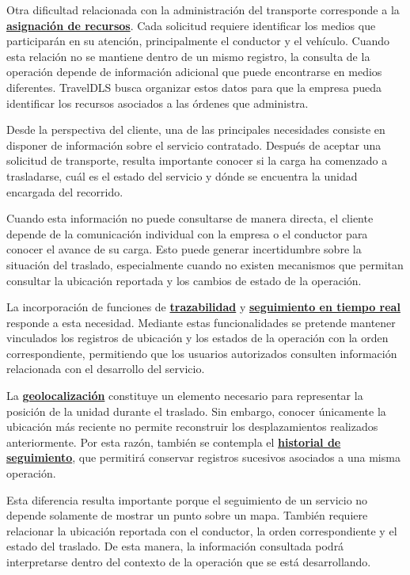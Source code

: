 Otra dificultad relacionada con la administración del transporte corresponde a la \textbf{\hyperlink{concepto-asignacion}{asignación de recursos}}. Cada solicitud requiere identificar los medios que participarán en su atención, principalmente el conductor y el vehículo. Cuando esta relación no se mantiene dentro de un mismo registro, la consulta de la operación depende de información adicional que puede encontrarse en medios diferentes. TravelDLS busca organizar estos datos para que la empresa pueda identificar los recursos asociados a las órdenes que administra.

Desde la perspectiva del cliente, una de las principales necesidades consiste en disponer de información sobre el servicio contratado. Después de aceptar una solicitud de transporte, resulta importante conocer si la carga ha comenzado a trasladarse, cuál es el estado del servicio y dónde se encuentra la unidad encargada del recorrido.

Cuando esta información no puede consultarse de manera directa, el cliente depende de la comunicación individual con la empresa o el conductor para conocer el avance de su carga. Esto puede generar incertidumbre sobre la situación del traslado, especialmente cuando no existen mecanismos que permitan consultar la ubicación reportada y los cambios de estado de la operación.

La incorporación de funciones de \textbf{\hyperlink{concepto-trazabilidad}{trazabilidad}} y \textbf{\hyperlink{concepto-seguimiento-tiempo-real}{seguimiento en tiempo real}} responde a esta necesidad. Mediante estas funcionalidades se pretende mantener vinculados los registros de ubicación y los estados de la operación con la orden correspondiente, permitiendo que los usuarios autorizados consulten información relacionada con el desarrollo del servicio.

La \textbf{\hyperlink{concepto-geolocalizacion}{geolocalización}} constituye un elemento necesario para representar la posición de la unidad durante el traslado. Sin embargo, conocer únicamente la ubicación más reciente no permite reconstruir los desplazamientos realizados anteriormente. Por esta razón, también se contempla el \textbf{\hyperlink{concepto-historial}{historial de seguimiento}}, que permitirá conservar registros sucesivos asociados a una misma operación.

Esta diferencia resulta importante porque el seguimiento de un servicio no depende solamente de mostrar un punto sobre un mapa. También requiere relacionar la ubicación reportada con el conductor, la orden correspondiente y el estado del traslado. De esta manera, la información consultada podrá interpretarse dentro del contexto de la operación que se está desarrollando.

